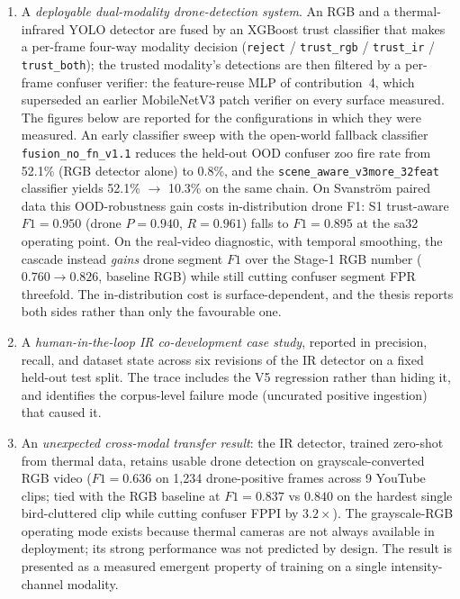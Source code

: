 \begin{enumerate}
    \item A \emph{deployable dual-modality drone-detection system}. An RGB and a thermal-infrared YOLO detector are fused by an XGBoost trust classifier that makes a per-frame four-way modality decision (\texttt{reject} / \texttt{trust\_rgb} / \texttt{trust\_ir} / \texttt{trust\_both}); the trusted modality's detections are then filtered by a per-frame confuser verifier: the feature-reuse MLP of contribution~4, which superseded an earlier MobileNetV3 patch verifier on every surface measured. The figures below are reported for the configurations in which they were measured. An early classifier sweep with the open-world fallback classifier \texttt{fusion\_no\_fn\_v1.1} reduces the held-out OOD confuser zoo fire rate from 52.1\% (RGB detector alone) to 0.8\%, and the \texttt{scene\_aware\_v3more\_32feat} classifier yields 52.1\% $\to$ 10.3\% on the same chain. On Svanstr\"om paired data this OOD-robustness gain costs in-distribution drone F1: S1 trust-aware $F1=0.950$ (drone $P=0.940$, $R=0.961$) falls to $F1=0.895$ at the sa32 operating point. On the real-video diagnostic, with temporal smoothing, the cascade instead \emph{gains} drone segment $F1$ over the Stage-1 RGB number ($0.760 \to 0.826$, baseline RGB) while still cutting confuser segment FPR threefold. The in-distribution cost is surface-dependent, and the thesis reports both sides rather than only the favourable one.
    \item A \emph{human-in-the-loop IR co-development case study}, reported in precision, recall, and dataset state across six revisions of the IR detector on a fixed held-out test split. The trace includes the V5 regression rather than hiding it, and identifies the corpus-level failure mode (uncurated positive ingestion) that caused it.
    \item An \emph{unexpected cross-modal transfer result}: the IR detector, trained zero-shot from thermal data, retains usable drone detection on grayscale-converted RGB video ($F1=0.636$ on 1{,}234 drone-positive frames across 9 YouTube clips; tied with the RGB baseline at $F1=0.837$ vs $0.840$ on the hardest single bird-cluttered clip while cutting confuser FPPI by $3.2\times$). The grayscale-RGB operating mode exists because thermal cameras are not always available in deployment; its strong performance was not predicted by design. The result is presented as a measured emergent property of training on a single intensity-channel modality.

\end{enumerate}
